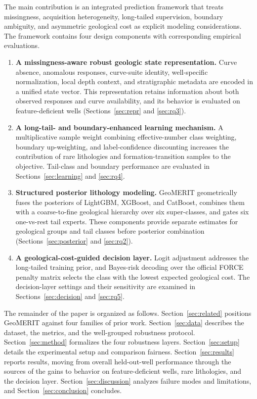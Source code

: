 \documentclass[bdcc,article,submit,pdftex,moreauthors]{Definitions/mdpi}
\begin{document}
The main contribution is an integrated prediction framework that treats
missingness, acquisition heterogeneity, long-tailed supervision, boundary ambiguity, and
asymmetric geological cost as explicit modeling considerations. The framework contains four
design components with corresponding empirical evaluations.
\begin{enumerate}
\item \textbf{A missingness-aware robust geologic state representation.} Curve absence,
anomalous responses, curve-suite identity, well-specific normalization, local depth context,
and stratigraphic metadata are encoded in a unified state vector. This representation retains
information about both observed responses and curve availability, and its behavior is evaluated
on feature-deficient wells
(Sections~\ref{sec:repr} and \ref{sec:rq3}).
\item \textbf{A long-tail- and boundary-enhanced learning mechanism.} A multiplicative sample
weight combining effective-number class weighting, boundary up-weighting, and label-confidence
discounting increases the contribution of rare lithologies and formation-transition samples
to the objective. Tail-class and boundary performance are evaluated in
Sections~\ref{sec:learning} and \ref{sec:rq4}.
\item \textbf{Structured posterior lithology modeling.} GeoMERIT geometrically fuses the
posteriors of LightGBM, XGBoost, and CatBoost, combines them with a
coarse-to-fine geological hierarchy over six super-classes, and gates six one-vs-rest tail
experts. These components provide separate estimates for geological groups and tail classes
before posterior combination (Sections~\ref{sec:posterior} and \ref{sec:rq2}).
\item \textbf{A geological-cost-guided decision layer.} Logit adjustment addresses the
long-tailed training prior, and Bayes-risk decoding over the official FORCE penalty matrix
selects the class with the lowest expected geological cost. The decision-layer settings and
their sensitivity are examined in Sections~\ref{sec:decision} and \ref{sec:rq5}.
\end{enumerate}

The remainder of the paper is organized as follows. Section~\ref{sec:related} positions
GeoMERIT against four families of prior work. Section~\ref{sec:data} describes the dataset,
the metrics, and the well-grouped robustness protocol. Section~\ref{sec:method} formalizes
the four robustness layers. Section~\ref{sec:setup} details the experimental setup and
comparison fairness. Section~\ref{sec:results} reports results, moving from overall
held-out-well performance through the sources of the gains to behavior on feature-deficient
wells, rare lithologies, and the decision layer. Section~\ref{sec:discussion} analyzes failure
modes and limitations, and
Section~\ref{sec:conclusion} concludes.
\end{document}

